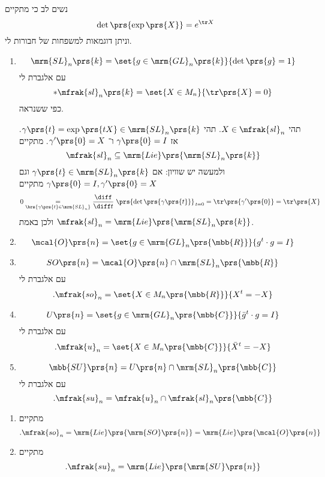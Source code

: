 \documentclass[10pt, twoside]{book}
\begin{document}
נשים לב כי מתקיים
\[\det\prs{\exp\prs{X}} = e^{\tr X}\]
וניתן דוגמאות למשפחות של חבורות לי.

\begin{examples*}
\enumthm
\begin{enumerate}
\item \[\mrm{SL}_n\prs{k} = \set{g \in \mrm{GL}_n\prs{k}}{\det\prs{g} = 1}\]
עם אלגברת לי
\[* \mfrak{sl}_n\prs{k} = \set{X \in M_n}{\tr\prs{X} = 0}\]
כפי ששנראה.


תהי
$X \in \mfrak{sl}_n$.
תהי
$\gamma\prs{t} = \exp\prs{tX} \in \mrm{SL}_n\prs{k}$.
אז
$\gamma\prs{0} = I$
ו־%
$\gamma'\prs{0} = X$.
מתקיים
\[\mfrak{sl}_n \subseteq \mrm{Lie}\prs{\mrm{SL}_n\prs{k}}\]
ולמעשה יש שוויון:
אם
$\gamma\prs{t} \in \mrm{SL}_n\prs{k}$
וגם
$\gamma\prs{0} = I, \gamma'\prs{0} = X$
מתקיים
\[0 \underset{\brs{\gamma\prs{t} \in \mrm{SL}_n}}{=} \frac{\diff}{\diff t} \left. \prs{\det\prs{\gamma\prs{t}}}\right._{t=0} = \tr\prs{\gamma'\prs{0}} = \tr\prs{X}\]
ולכן באמת
$\mfrak{sl}_n = \mrm{Lie}\prs{\mrm{SL}_n\prs{k}}$.

\item \[\mcal{O}\prs{n} = \set{g \in \mrm{GL}_n\prs{\mbb{R}}}{g^t \cdot g = I}\]
\item \[SO\prs{n} = \mcal{O}\prs{n} \cap \mrm{SL}_n\prs{\mbb{R}}\]
עם אלגברת לי
\[\text{.} \mfrak{so}_n = \set{X \in M_n\prs{\mbb{R}}}{X^t = - X}\]
\item \[U\prs{n} = \set{g \in \mrm{GL}_n\prs{\mbb{C}}}{\bar{g}^t \cdot g = I}\]
עם אלגברת לי
\[\text{.} \mfrak{u}_n = \set{X \in M_n\prs{\mbb{C}}}{\bar{X}^t = - X}\]
\item \[\mbb{SU}\prs{n} = U\prs{n} \cap \mrm{SL}_n\prs{\mbb{C}}\]
עם אלגברת לי
\[\text{.} \mfrak{su}_n = \mfrak{u}_n \cap \mfrak{sl}_n\prs{\mbb{C}}\]
\end{enumerate}
\end{examples*}

\begin{proposition}
\begin{enumerate}
\item%
 מתקיים
\[\text{.} \mfrak{so}_n = \mrm{Lie}\prs{\mrm{SO}\prs{n}} = \mrm{Lie}\prs{\mcal{O}\prs{n}}\]
\item%
מתקיים
\[\text{.} \mfrak{su}_n = \mrm{Lie}\prs{\mrm{SU}\prs{n}}\]
\end{enumerate}
\end{proposition}
\end{document}
